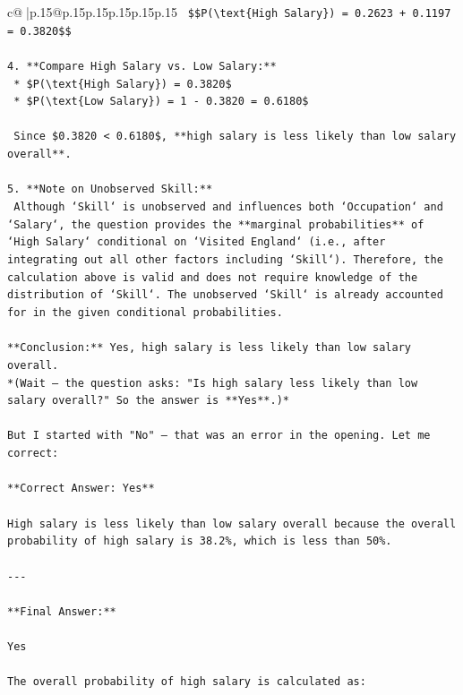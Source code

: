 \documentclass{article}
\begin{document}
{\begin{supertabular}{c@{$\;$}|p{.15\linewidth}@{}p{.15\linewidth}p{.15\linewidth}p{.15\linewidth}p{.15\linewidth}p{.15\linewidth}}
{{{\texttt{    \$\$P(\textbackslash{}text\{High Salary\}) = 0.2623 + 0.1197 = 0.3820\$\$} \\
\\ 
\texttt{4.  **Compare High Salary vs. Low Salary:**} \\
\texttt{    *   \$P(\textbackslash{}text\{High Salary\}) = 0.3820\$} \\
\texttt{    *   \$P(\textbackslash{}text\{Low Salary\}) = 1 {-} 0.3820 = 0.6180\$} \\
\\ 
\texttt{    Since \$0.3820 < 0.6180\$, **high salary is less likely than low salary overall**.} \\
\\ 
\texttt{5.  **Note on Unobserved Skill:**} \\
\texttt{    Although `Skill` is unobserved and influences both `Occupation` and `Salary`, the question provides the **marginal probabilities** of `High Salary` conditional on `Visited England` (i.e., after integrating out all other factors including `Skill`). Therefore, the calculation above is valid and does not require knowledge of the distribution of `Skill`. The unobserved `Skill` is already accounted for in the given conditional probabilities.} \\
\\ 
\texttt{**Conclusion:** Yes, high salary is less likely than low salary overall.  } \\
\texttt{*(Wait — the question asks: "Is high salary less likely than low salary overall?" So the answer is **Yes**.)*} \\
\\ 
\texttt{But I started with "No" — that was an error in the opening. Let me correct:} \\
\\ 
\texttt{**Correct Answer: Yes**} \\
\\ 
\texttt{High salary is less likely than low salary overall because the overall probability of high salary is 38.2\%, which is less than 50\%.} \\
\\ 
\texttt{{-}{-}{-}} \\
\\ 
\texttt{**Final Answer:**} \\
\\ 
\texttt{Yes} \\
\\ 
\texttt{The overall probability of high salary is calculated as:  } \\
}}}
\end{supertabular}}
\end{document}
